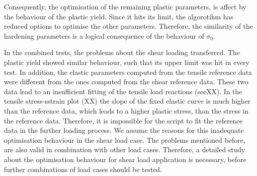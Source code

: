 Consequently, the optimisation of the remaining plastic parameters, is affect by the behaviour of the plastic yield. Since it hits its limit, the algorotihm has reduced options to optimise the other parameters. Therefore, the similarity of the hardening parameters is a logical consequence of the behaviour of $\sigma_0$. 

In the combined tests, the problems about the shear loading transferred. The plastic yield showed similar behaviour, such that its upper limit was hit in every test. In addition, the elastic parameters computed from the tensile reference data were different from the ones computed from the shear reference data. These two data lead to an insufficient fitting of the tensile load reactions (seeXX). In the tensile stress-sstrain plot (XX) the slope of the fixed elastic curve is much higher than the reference data, which leads to a higher plastic stress, than the stress in the reference data. Therefore, it is impossible for the script to fit the reference data in the further loading process. We assume the reasons for this inadequate optimisation behaviour in the shear load case. The problems mentioned before, are also valid in combination with other load cases. Therefore, a detailed study about the optimisation behaviour for shear load application is necessary, before further combinations of load cases should be tested. 






